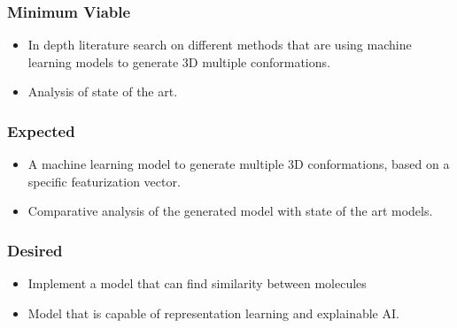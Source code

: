 \documentclass[rnd]{mas_proposal}
\begin{document}
\subsubsection*{Minimum Viable}

\begin{itemize}
    \item In depth literature search on different methods that are using machine learning models to generate 3D multiple conformations.
    \item Analysis of state of the art. 
\end{itemize}

\subsubsection*{Expected}
\begin{itemize}
    \item A machine learning model to generate multiple 3D conformations, based on a specific featurization vector.
    \item Comparative analysis of the generated model with state of the art models.
\end{itemize}

\subsubsection*{Desired}
\begin{itemize}
    \item Implement a model that can find similarity between molecules
   \item Model that is capable of representation learning and explainable AI.
\end{itemize}
\

\nocite{*}

\end{document}
